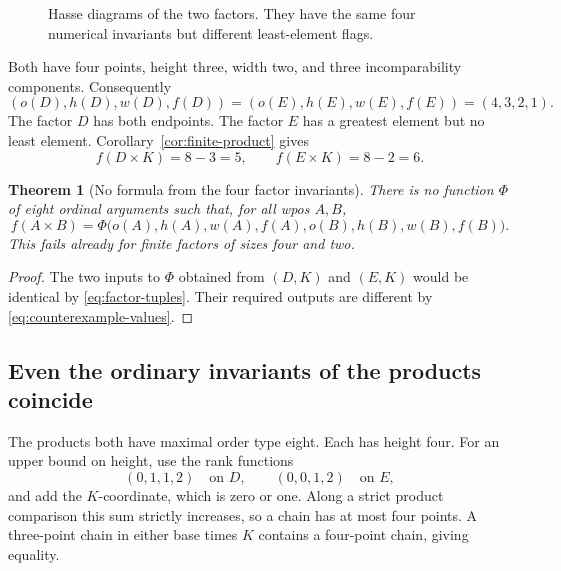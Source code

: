 \documentclass[11pt,letterpaper]{article}
\newtheorem{theorem}{Theorem}[section]
\theoremstyle{definition}
\theoremstyle{remark}
\newcommand{\one}{\mathbf{1}}
\newcommand{\anti}[1]{\Gamma_{#1}}
\begin{document}
\begin{figure}[ht]
\centering
{}
\caption{Hasse diagrams of the two factors. They have the same four
numerical invariants but different least-element flags.}
\label{fig:counterexample}
\end{figure}

Both have four points, height three, width two, and three incomparability
components. Consequently
\begin{equation}\label{eq:factor-tuples}
 (o(D),h(D),w(D),f(D))=(o(E),h(E),w(E),f(E))=(4,3,2,1).
\end{equation}
The factor $D$ has both endpoints. The factor $E$ has a greatest element
but no least element. Corollary~\ref{cor:finite-product} gives
\begin{equation}\label{eq:counterexample-values}
 f(D\times K)=8-3=5,
 \qquad
 f(E\times K)=8-2=6.
\end{equation}

\begin{theorem}[No formula from the four factor invariants]\label{thm:no-scalar}
There is no function $\Phi$ of eight ordinal arguments such that, for all
wpos $A,B$,
\[
 f(A\times B)=
 \Phi\bigl(o(A),h(A),w(A),f(A),o(B),h(B),w(B),f(B)\bigr).
\]
This fails already for finite factors of sizes four and two.
\end{theorem}
\begin{proof}
The two inputs to $\Phi$ obtained from $(D,K)$ and $(E,K)$ would be
identical by \eqref{eq:factor-tuples}. Their required outputs are different
by \eqref{eq:counterexample-values}.
\end{proof}

\subsection{Even the ordinary invariants of the products coincide}
The products both have maximal order type eight. Each has height four.
For an upper bound on height, use the rank functions
\[
 (0,1,1,2)\quad\text{on }D,
 \qquad (0,0,1,2)\quad\text{on }E,
\]
and add the $K$-coordinate, which is zero or one. Along a strict product
comparison this sum strictly increases, so a chain has at most four
points. A three-point chain in either base times $K$ contains a four-point
chain, giving equality.
\end{document}
